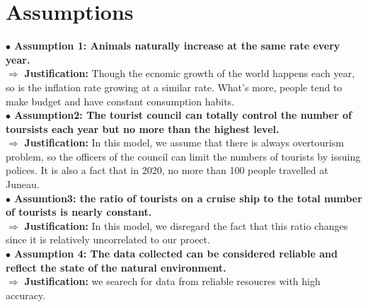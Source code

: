 \documentclass[UTF8]{mcmthesis}
\begin{document}
    \section{Assumptions}

                \hspace*{1em} \textbf{$\bullet$ Assumption 1: Animals naturally increase at the same rate every year.} \\
                \hspace*{2em} \(\Rightarrow\) \textbf{Justification:} Though the ecnomic growth of the world happens each year, so is the inflation rate growing at a similar rate. What's more, people tend to make budget and have constant consumption habits.\\
                \hspace*{1em} \textbf{$\bullet$ Assumption2: The tourist council can totally control the number of toursists each year but no more than the highest level.} \\
                \hspace*{2em} \(\Rightarrow\) \textbf{Justification:} In this model, we assume that there is always overtourism problem, so the officers of the council can limit the numbers of tourists by issuing polices. It is also a fact that in 2020, no more than 100 people travelled at Juneau.\\
                \hspace*{1em}      \textbf{$\bullet$ Assumtion3: the ratio  of tourists on a cruise ship to the total number of tourists is nearly constant.} \\
                \hspace*{2em} \(\Rightarrow\) \textbf{Justification:} In this model, we disregard the fact that this ratio changes since it is relatively uncorrelated to our proect.\\
                \hspace*{1em}\textbf{$\bullet$ Assumption 4: The data collected can be considered reliable and reflect the state of the natural environment.} 
        \\        \hspace*{2em} \(\Rightarrow\) \textbf{Justification:} we searech for data from reliable resoucres with high accuracy.
\end{document}
